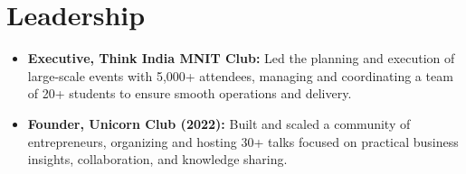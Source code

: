 \documentclass{resume}
\begin{document}
\section{Leadership}
\begin{itemize}
  \item \textbf{Executive, Think India MNIT Club:} Led the planning and execution of large-scale events with 5,000+ attendees, managing and coordinating a team of 20+ students to ensure smooth operations and delivery.
  \item \textbf{Founder, Unicorn Club (2022):} Built and scaled a community of entrepreneurs, organizing and hosting 30+ talks focused on practical business insights, collaboration, and knowledge sharing.
\end{itemize}
\end{document}
